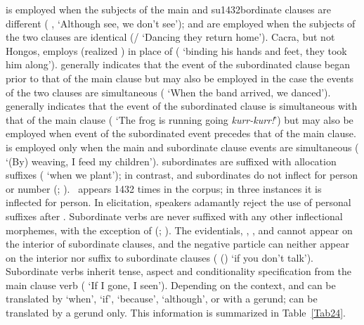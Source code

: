  is employed when the subjects of the main and su1432bordinate clauses are different ( ,   ‘Although  see, we don’t see’);  and  are employed when the subjects of the two clauses are identical (/   ‘Dancing they return home’). Cacra, but not Hongos, employs  (realized \textipa{[l]}) in place of  (  ‘binding his hands and feet, they took him along’).  generally indicates that the event of the subordinated clause began prior to that of the main clause but may also be employed in the case the events of the two clauses are simultaneous (   ‘When the band arrived, we danced’).  generally indicates that the event of the subordinated clause is simultaneous with that of the main clause (   ‘The frog is running going \emph{kurr-kurr!}’) but may also be employed when event of the subordinated event precedes that of the main clause.  is employed only when the main and subordinate clause events are simultaneous (   ‘(By) weaving, I feed my children’).  subordinates are suffixed with allocation suffixes ( ‘when we plant’); in contrast,  and  subordinates do not inflect for person or number (; ).\
{ appears 1432 times in the corpus; in three instances it is inflected for person. In elicitation, speakers adamantly reject the use of personal suffixes after .} Subordinate verbs are never suffixed with any other inflectional morphemes, with the exception of  (; ). The evidentials, , , and  cannot appear on the interior of subordinate clauses, and the negative particle  can neither appear on the interior nor suffix to subordinate clauses ( () ‘if you don’t talk’). Subordinate verbs inherit tense, aspect and conditionality specification from the main clause verb (   ‘If I  gone, I  seen’). Depending on the context,  and  can be translated by ‘when’, ‘if’, ‘because’, ‘although’, or with a gerund;  can be translated by a gerund only. This information is summarized in Table~\ref{Tab24}.


